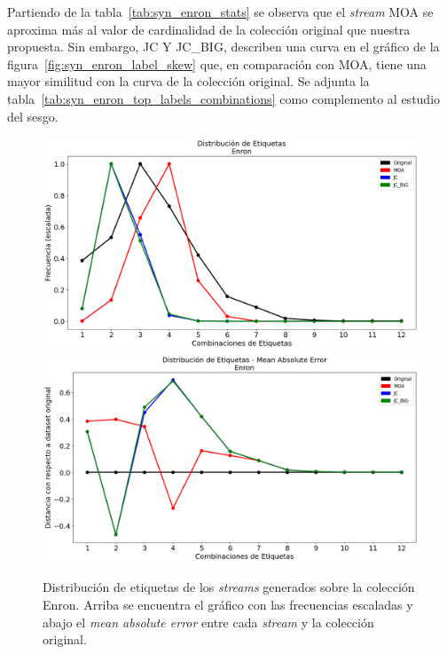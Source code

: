 Partiendo de la tabla~\ref{tab:syn_enron_stats} se observa que el
\textit{stream} MOA se aproxima más al valor de cardinalidad de la colección
original que nuestra propuesta. Sin embargo, JC Y JC\_BIG, describen una curva
en el gráfico de la figura~\ref{fig:syn_enron_label_skew} que, en comparación
con MOA, tiene una mayor similitud con la curva de la colección original.  Se
adjunta la tabla~\ref{tab:syn_enron_top_labels_combinations} como complemento al
estudio del sesgo.

\begin{figure}[htbp]
	\includegraphics[width=\linewidth]{figures/experiments/syn/enron/label_distribution.png}
	\includegraphics[width=\linewidth]{figures/experiments/syn/enron/ld_mae.png}
	\caption[Distribución de etiquetas de los \textit{streams} generados sobre la colección
		Enron.]{Distribución de etiquetas de los \textit{streams} generados sobre la colección
		Enron. Arriba se encuentra el gráfico con las frecuencias escaladas y
		abajo el \textit{mean absolute error} entre cada \textit{stream} y la
		colección original.}
	\label{fig:syn_enron_label_distribution}
\end{figure}

